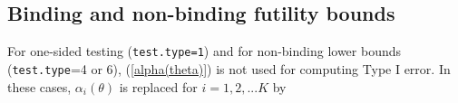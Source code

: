 \subsection{Binding and non-binding futility bounds\label{sec:nonbinding}}

For one-sided testing (\texttt{test.type=1}) and for non-binding lower bounds
(\texttt{test.type}=4 or 6), (\ref{alpha(theta)}) is not used for computing
Type I error. In these cases, $\alpha_{i}(\theta)$ is replaced for
$i=1,2,...K$ by
